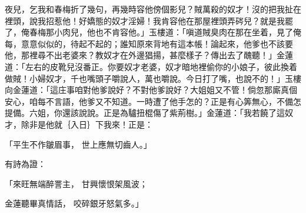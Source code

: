 夜兒，乞我和春梅折了幾句，再幾時容他傍個影兒？賊萬殺的奴才！沒的把我扯在裡頭，說我招惹他！好嬌態的奴才淫婦！我肯容他在那屋裡頭弄硶兒？就是我罷了，俺春梅那小肉兒，他也不肯容他。」玉樓道：「嗔道賊臭肉在那在坐着，見了俺每，意意似似的，待起不起的；誰知原來背地有這本帳！論起來，他爹也不該要他，那裡尋不出老婆來？教奴才在外邊猖揚，甚麼樣子？傳出去了醜聽！」金蓮道：「左右的皮靴兒沒番正。你要奴才老婆，奴才暗地裡偷你的小娘子，彼此換着做賊！小婦奴才，千也嘴頭子嚼說人，萬也嚼說。今日打了嘴，也說不的！」玉樓向金蓮道：「這庄事咱對他爹說好？不對他爹說好？大姐姐又不管！倘忽那廝真個安心，咱每不言語，他爹又不知道。一時遭了他手怎的？正是有心筭無心，不備怎提備。六姐，你還該說說。正是為驢扭棍傷了紫荊樹。」金蓮道：「我若饒了這奴才，除非是他就｛入日｝下我來！正是：

「平生不作皺眉事，  世上應無切齒人。」

有詩為證：

「來旺無端醉詈主，  甘興懷恨架風波；

金蓮聽畢真情話，  咬碎銀牙怒氣多。」

